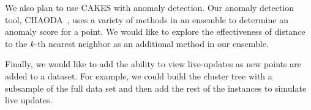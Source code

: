 We also plan to use CAKES with anomaly detection. Our anomaly detection tool, CHAODA~\cite{ishaq2021clustered}, uses 
a variety of methods in an ensemble to determine an anomaly score for a point. We would like to explore the effectiveness of 
distance to the $k$-th nearest neighbor as an additional method in our ensemble.

Finally, we would like to add the ability to view live-updates as new points are added to a dataset. For example, 
we could build the cluster tree with a subsample of the full data set and then add the rest of the instances to 
simulate live updates.

